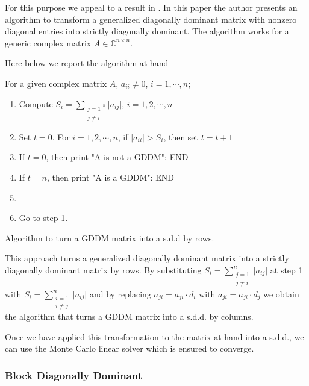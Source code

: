 \documentclass[a4paper,10pt]{article}
\begin{document}
For this purpose we
appeal to a result in \cite{Li2002}. In this paper the author presents an
algorithm to transform a generalized diagonally dominant matrix with
nonzero diagonal entries into strictly diagonally dominant. The
algorithm works for a generic complex matrix $A\in\mathbb{C}^{n\times n}$.

Here below we report the algorithm at hand\newline

\begin{algorithm}[H]
 For a given complex matrix $A$, $a_{ii}\ne 0$, $i=1,\cdots, n$;\newline
 \begin{enumerate}
  \item Compute $S_{i}=\sum_{\substack{j=1 \\ j\ne i}^{n}}\lvert
a_{ij}\rvert$,
$i=1,2,\cdots,n$
\item Set $t=0$. For $i=1,2,\cdots, n$, if $\lvert a_{ii}\rvert>S_i$, then set
$t=t+1$
\item If $t=0$, then print "A is not a GDDM": END
\item If $t=n$, then print "A is a GDDM": END
\item {}
\item Go to step 1.
 \end{enumerate}
 \caption{Algorithm to turn a GDDM matrix into a s.d.d by rows.}
\end{algorithm}

This approach turns a generalized diagonally dominant matrix into a
strictly diagonally dominant matrix by rows. By substituting
$\displaystyle S_{i}=\sum^{n}_{\substack{j=1 \\ j\ne i}}\lvert a_{ij}\rvert$
at step 1 with
$\displaystyle S_{i}=\sum^{n}_{\substack{i=1 \\ i\ne j}}\lvert a_{ij}\rvert$
and by replacing
$a_{ji}=a_{ji}\cdot d_i$ with $a_{ji}=a_{ji}\cdot d_j$ we obtain the algorithm
that turns a GDDM matrix into a s.d.d. by columns.\newline

Once we have applied this transformation to the matrix at hand into a s.d.d.,
we can use the Monte Carlo linear solver which is ensured to converge.

\subsubsection{Block Diagonally Dominant}
\end{document}
